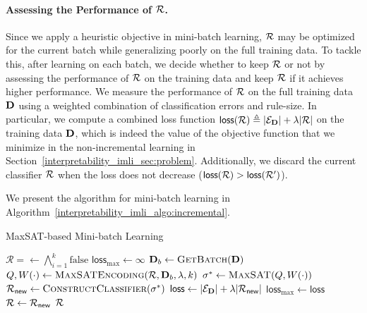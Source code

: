 \paragraph{Assessing  the Performance of $ {\mathcal{R}} $.} Since we apply a heuristic objective in mini-batch learning,  $ {\mathcal{R}} $ may be optimized for the current batch while generalizing poorly on the full training data. To tackle this, after learning on each batch, we decide whether to keep $ {\mathcal{R}} $ or not by assessing the performance of $ {\mathcal{R}} $ on the training data and keep $ {\mathcal{R}} $ if it achieves higher performance. We measure the performance of $ {\mathcal{R}} $ on the full training data $ \mathbf{D} $ using a weighted combination of classification errors and rule-size. In particular, we compute a combined loss function $ \mathsf{loss}({\mathcal{R}}) \triangleq |\mathcal{E}_{\mathbf{D}}| +\lambda |\mathcal{R}| $ on the training data $ \mathbf{D} $, which is indeed the value of the objective function that we minimize in the non-incremental learning in Section~\ref{interpretability_imli_sec:problem}. Additionally, we  discard the current classifier $ {\mathcal{R}} $ when the loss does not decrease ($ \mathsf{loss}({\mathcal{R}}) > \mathsf{loss}({\mathcal{R}}') $). 

We present the algorithm for mini-batch learning in Algorithm~\ref{interpretability_imli_algo:incremental}. 
\begin{algorithm}
	\caption{MaxSAT-based Mini-batch Learning}
	\label{interpretability_imli_algo:incremental}
	\begin{algorithmic}[1]
		\State $\mathcal{R} = \leftarrow \bigwedge_{i=1}^k\text{false} $ 
		\State $ \mathsf{loss}_{\max} \leftarrow \infty$ 
		 
		\State $ \mathbf{D}_b \leftarrow \textsc{GetBatch}(\mathbf{D}) $
		\State $ Q, W \! \left( \cdot \right) \leftarrow \textsc{MaxSATEncoding}({\mathcal{R}}, \mathbf{D}_b, \lambda, k) $ 
		\State $ \sigma^* \leftarrow \textsc{MaxSAT}(Q,W \! \left( \cdot \right)) $
		\State $ {\mathcal{R}}_{\mathsf{new}} \leftarrow \textsc{ConstructClassifier}(\sigma^*) $
		\State $ \mathsf{loss} \leftarrow  |\mathcal{E}_{\mathbf{D}}| +\lambda |\mathcal{R}_{\mathsf{new}}| $ 
		\State $ \mathsf{loss}_{\max} \leftarrow \mathsf{loss} $
		\State $ {\mathcal{R}} \leftarrow {\mathcal{R}}_{\mathsf{new}} $
		\EndIf
		\EndFor
		\State \Return $ {\mathcal{R}} $
		\EndFunction
	\end{algorithmic}
\end{algorithm} 	

